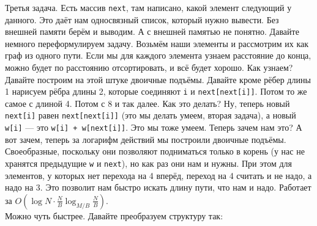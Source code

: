 \documentclass{article}
\newcommand{\pseudo}{PseudoLexer.py:PseudoLexer -x}
\newcommand{\pseudocode}[1]{\texttt{#1}}
\begin{document}
    Третья задача. Есть массив \pseudocode{next}, там написано, какой элемент следующий у данного. Это даёт нам односвязный список, который нужно вывести. Без внешней памяти берём и выводим. А с внешней памятью не понятно. Давайте немного переформулируем задачу. Возьмём наши элементы и рассмотрим их как граф из одного пути. Если мы для каждого элемента узнаем расстояние до конца, можно будет по расстоянию отсортировать, и всё будет хорошо. Как узнаем? Давайте построим на этой штуке двоичные подъёмы. Давайте кроме рёбер длины 1 нарисуем рёбра длины 2, которые соединяют \pseudocode{i} и \pseudocode{next[next[i]]}. Потом то же самое с длиной 4. Потом с 8 и так далее. Как это делать? Ну, теперь новый \pseudocode{next[i]} равен \pseudocode{next[next[i]]} (это мы делать умеем, вторая задача), а новый \pseudocode{w[i]} --- это \pseudocode{w[i] + w[next[i]]}. Это мы тоже умеем. Теперь зачем нам это? А вот зачем, теперь за логарифм действий мы построили двоичные подъёмы. Своеобразные, поскольку они позволяют подниматься только в корень (у нас не хранятся предыдущие \pseudocode{w} и \pseudocode{next}), но как раз они нам и нужны. При этом для элементов, у которых нет перехода на 4 вперёд, переход на 4 считать и не надо, а надо на 3. Это позволит нам быстро искать длину пути, что нам и надо. Работает за $O\left(\log N\cdot\frac NB\log_{M/B}\frac NB\right)$.\\
    Можно чуть быстрее. Давайте преобразуем структуру так:
    \begin{figure}[H]
    \end{figure}\noindent
\end{document}
